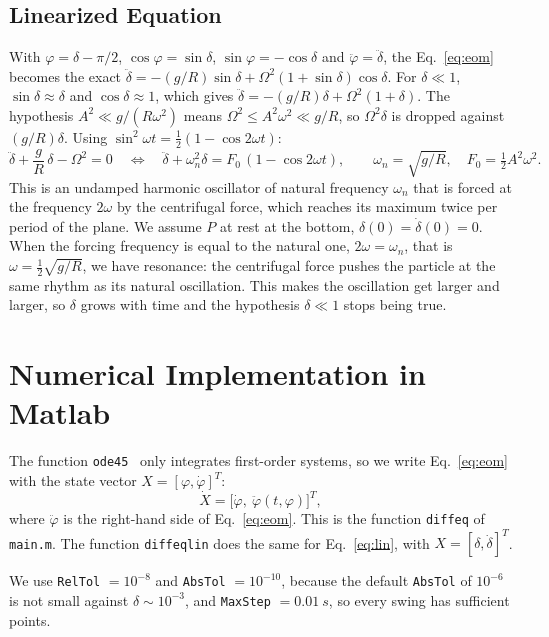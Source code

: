 \documentclass[11pt,a4paper]{article}
\numberwithin{equation}{section}
\newcommand{\dph}{\dot\varphi}
\newcommand{\ddph}{\ddot\varphi}
\begin{document}
\subsection{Linearized Equation}\label{sec:lin}
With $\varphi=\delta-\pi/2$, $\cos\varphi=\sin\delta$, $\sin\varphi=-\cos\delta$ and $\ddph=\ddot\delta$, the Eq.~\eqref{eq:eom} becomes the exact $\ddot\delta=-(g/R)\sin\delta+\Omega^2(1+\sin\delta)\cos\delta$. For $\delta\ll1$, $\sin\delta\approx\delta$ and $\cos\delta\approx1$, which gives $\ddot\delta=-(g/R)\delta+\Omega^2(1+\delta)$. The hypothesis $A^2\ll g/(R\omega^2)$ means $\Omega^2\le A^2\omega^2\ll g/R$, so $\Omega^2\delta$ is dropped against $(g/R)\delta$. Using $\sin^2\omega t=\tfrac12(1-\cos2\omega t)$:
\begin{equation}
\ddot\delta+\frac gR\,\delta-\Omega^2=0\quad\Longleftrightarrow\quad\ddot\delta+\omega_n^2\delta=F_0\,(1-\cos2\omega t),\qquad \omega_n=\sqrt{g/R},\quad F_0=\tfrac12A^2\omega^2 .\label{eq:lin}
\end{equation}
This is an undamped harmonic oscillator of natural frequency $\omega_n$ that is forced at the frequency $2\omega$ by the centrifugal force, which reaches its maximum twice per period of the plane. We assume $P$ at rest at the bottom, $\delta(0)=\dot\delta(0)=0$. When the forcing frequency is equal to the natural one, $2\omega=\omega_n$, that is $\omega=\tfrac12\sqrt{g/R}$, we have resonance: the centrifugal force pushes the particle at the same rhythm as its natural oscillation. This makes the oscillation get larger and larger, so $\delta$ grows with time and the hypothesis $\delta\ll1$ stops being true.

\section{Numerical Implementation in Matlab}\label{sec:num}
The function \texttt{ode45}~\cite{matlab} only integrates first-order systems, so we write Eq.~\eqref{eq:eom} with the state vector $X=[\varphi,\dph]^T$:
\begin{equation}
\dot X=\big[\dph,\ \ddph(t,\varphi)\big]^T ,\label{eq:state}
\end{equation}
where $\ddph$ is the right-hand side of Eq.~\eqref{eq:eom}. This is the function \texttt{diffeq} of \texttt{main.m}. The function \texttt{diffeqlin} does the same for Eq.~\eqref{eq:lin}, with $X=[\delta,\dot\delta]^T$.

We use \texttt{RelTol} $=10^{-8}$ and \texttt{AbsTol} $=10^{-10}$, because the default \texttt{AbsTol} of $10^{-6}$ is not small against $\delta\sim10^{-3}$, and \texttt{MaxStep} $=\SI{0.01}{s}$, so every swing has sufficient points.
\end{document}
